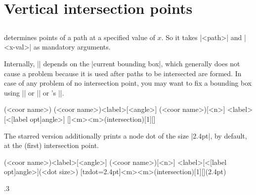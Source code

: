 \section{Vertical intersection points}
\label{s:tzvXpointat}

\subsection{\protect\cmd{\tzvXpointat(*)}}
\label{ss:tzvXpointat}

\icmd{\tzvXpointat} determines  points of a path at a specified value of $x$.
So it takes |{<path>}| and |{<x-val>}| as mandatory arguments.

\remark 
Internally, |\tzvXpointat| depends on the |current bounding box|, which generally does not cause a problem because it is used after paths to be intersected are formed.
In case of any problem of no intersection point, you may want to fix a bounding box using  |\tzbbox| or |\tzaxes*| or \Tikz's |\useasboundingbox|.

\begin{tzdef}{}
(<coor name>)
(<coor name>){<label>}[<angle>]
(<coor name>)[<n>]
            {<label>}[<[label opt]angle>]
  []{<m>}{<m>}(intersection)[1]{}[]
\end{tzdef}

The starred version \icmd{\tzvXpointat*} additionally prints a node dot of the size |2.4pt|, by default, at the (first) intersection point.

\begin{tzdef}{}
(<coor name>){<label>}[<angle>]
(<coor name>)[<n>]
             {<label>}[<[label opt]angle>](<dot size>)
  [tzdot=2.4pt]{<m>}{<m>}(intersection)[1]{}[](2.4pt)
\end{tzdef}

\begin{tzcode}{.3}
\end{tzcode}


